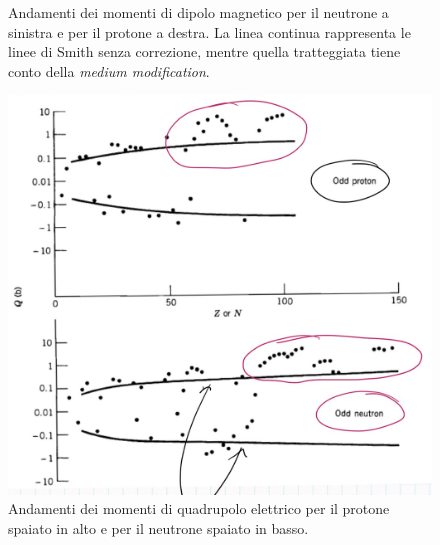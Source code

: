 \begin{figure}[!h]
    \caption{Andamenti dei momenti di dipolo magnetico per il neutrone a sinistra e per il protone a destra. La linea continua rappresenta le linee di Smith senza correzione, mentre quella tratteggiata tiene conto della \textit{medium modification}.}
    \label{curve}
\end{figure}

\begin{figure}[!h]
    \centering
    \includegraphics[scale=0.2]{Immagini/andamenti.png}
    \caption{Andamenti dei momenti di quadrupolo elettrico per il protone spaiato in alto e per il neutrone spaiato in basso.}
    \label{Q}
\end{figure}
\newpage